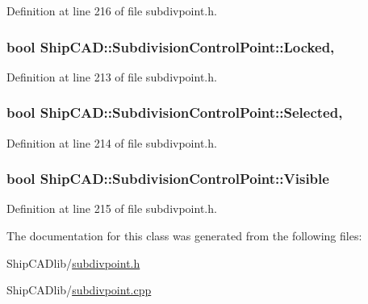 Definition at line 216 of file subdivpoint.\-h.

\hypertarget{classShipCAD_1_1SubdivisionControlPoint_af7c63177a12f4c60bb4a2a6615482a98}{
\subsubsection[{Locked}]{\setlength{\rightskip}{0pt plus 5cm}bool Ship\-C\-A\-D\-::\-Subdivision\-Control\-Point\-::\-Locked\hspace{0.3cm}{\ttfamily [read]}, {\ttfamily [write]}}}\label{classShipCAD_1_1SubdivisionControlPoint_af7c63177a12f4c60bb4a2a6615482a98}


Definition at line 213 of file subdivpoint.\-h.

\hypertarget{classShipCAD_1_1SubdivisionControlPoint_a54bf97e33f121843af563f2eebe7d3e5}{
\subsubsection[{Selected}]{\setlength{\rightskip}{0pt plus 5cm}bool Ship\-C\-A\-D\-::\-Subdivision\-Control\-Point\-::\-Selected\hspace{0.3cm}{\ttfamily [read]}, {\ttfamily [write]}}}\label{classShipCAD_1_1SubdivisionControlPoint_a54bf97e33f121843af563f2eebe7d3e5}


Definition at line 214 of file subdivpoint.\-h.

\hypertarget{classShipCAD_1_1SubdivisionControlPoint_ab796dbf230e01f51a1031ec69f8f7f66}{
\subsubsection[{Visible}]{\setlength{\rightskip}{0pt plus 5cm}bool Ship\-C\-A\-D\-::\-Subdivision\-Control\-Point\-::\-Visible\hspace{0.3cm}{\ttfamily [read]}}}\label{classShipCAD_1_1SubdivisionControlPoint_ab796dbf230e01f51a1031ec69f8f7f66}


Definition at line 215 of file subdivpoint.\-h.



The documentation for this class was generated from the following files\-:\begin{DoxyCompactItemize}
\item 
Ship\-C\-A\-Dlib/\hyperlink{subdivpoint_8h}{subdivpoint.\-h}\item 
Ship\-C\-A\-Dlib/\hyperlink{subdivpoint_8cpp}{subdivpoint.\-cpp}\end{DoxyCompactItemize}
